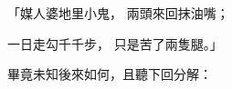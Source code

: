 \begin{showcontents}{}
「媒人婆地里小鬼，  兩頭來回抹油嘴；

一日走勾千千步，  只是苦了兩隻腿。」

畢竟未知後來如何，且聽下回分解：





\end{showcontents}


